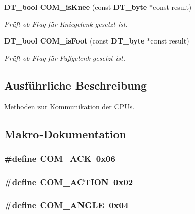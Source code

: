 \begin{DoxyCompactItemize}
{\bf DT\_\-bool} {\bf COM\_\-isKnee} (const {\bf DT\_\-byte} $\ast$const result)
\begin{DoxyCompactList}\small\item\em Prüft ob Flag für Kniegelenk gesetzt ist. \item\end{DoxyCompactList}\item 
{\bf DT\_\-bool} {\bf COM\_\-isFoot} (const {\bf DT\_\-byte} $\ast$const result)
\begin{DoxyCompactList}\small\item\em Prüft ob Flag für Fußgelenk gesetzt ist. \item\end{DoxyCompactList}\end{DoxyCompactItemize}


\subsection{Ausführliche Beschreibung}
Methoden zur Kommunikation der CPUs. 

\subsection{Makro-\/Dokumentation}
\subsubsection[{COM\_\-ACK}]{\setlength{\rightskip}{0pt plus 5cm}\#define COM\_\-ACK~0x06}\label{communication_8h_a24dd26e2a010787ebb17d762fb8ec90a}
\subsubsection[{COM\_\-ACTION}]{\setlength{\rightskip}{0pt plus 5cm}\#define COM\_\-ACTION~0x02}\label{communication_8h_a70fa83f2669b5e79785b39abe99fb7e0}
\subsubsection[{COM\_\-ANGLE}]{\setlength{\rightskip}{0pt plus 5cm}\#define COM\_\-ANGLE~0x04}\label{communication_8h_a38067e6ee6059c2e969f2a0804cdeb39}
